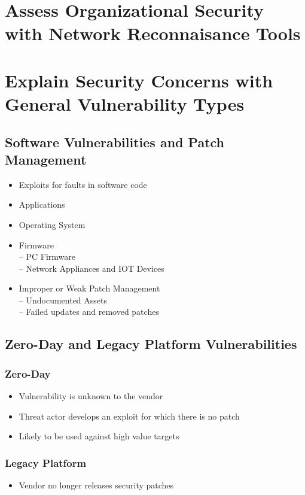 \section {Assess Organizational Security with Network Reconnaisance Tools}

\section {Explain Security Concerns with General Vulnerability Types}
	\subsection {Software Vulnerabilities and Patch Management}
		\begin{itemize}
			\item Exploits for faults in software code
			\item Applications
			\item Operating System
			\item Firmware \\
				-- PC Firmware \\
				-- Network Appliances and IOT Devices
			\item Improper or Weak Patch Management \\
				-- Undocumented Assets \\
				-- Failed updates and removed patches
		\end{itemize}
	\subsection {Zero-Day and Legacy Platform Vulnerabilities}
		\subsubsection {Zero-Day}
			\begin{itemize}
				\item Vulnerability is unknown to the vendor
				\item Threat actor develops an exploit for which there is no patch
				\item Likely to be used against high value targets
			\end{itemize}
		\subsubsection {Legacy Platform}
			\begin{itemize}
				\item Vendor no longer releases security patches
			\end{itemize}
